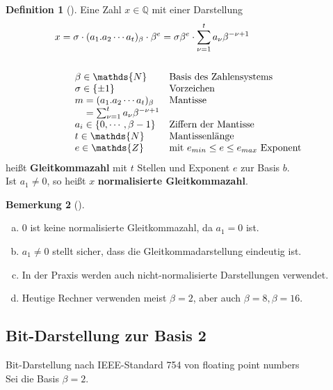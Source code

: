 \documentclass[ngerman,fontsize=11pt, paper=a4, parskip=half, titlepage=true, toc=bib]{scrbook}
\theoremstyle{definition}
\newtheorem{Def}{Definition}[section]		%
\newtheorem{Bem}[Def]{Bemerkung}	%
\theoremstyle{plain}
\newcommand{\Q}{\mathds{Q}}
\newcommand{\N}{\mathds{N}}
\newcommand{\Z}{\mathds{Z}}
\newcommand{\subsectione}[1]{\addtocounter{Def}{1}\subsection{#1}}
\newenvironment{Beme}[1][]{ %
  \begin{Bem}[#1]
  }
  {
  \end{Bem}
  \addtocounter{subsection}{1}
}
\newenvironment{Defe}[1][]{ %
  \begin{Def}[#1]
  }
  {
  \end{Def}
  \addtocounter{subsection}{1}
}
\begin{document}
\begin{Defe}
  \label{3.1.1} 
  Eine Zahl $x\in\Q$ mit einer Darstellung
  \begin{align*}
    x&=\sigma \cdot(a_1 . a_2 \cdots a_t)_{\beta}\cdot \beta^e 
       = \sigma\beta^e \cdot \sum_{\nu=1}^{t}a_\nu \beta^{-\nu+1}\\\\
     &\quad\begin{array}{ll}
             \beta\in\N & \text{Basis des Zahlensystems}\index{Basis}\\
             \sigma \in\{\pm 1\} &\text{Vorzeichen} \\
             m = (a_1 . a_2 \cdots a_t)_{\beta} &\text{Mantisse}\index{Mantisse}\\
             \phantom{m}= \sum_{\nu=1}^{t}a_\nu \beta^{-\nu+1} \\
             a_i \in\{0,\cdots , \beta-1\}&\text{Ziffern der Mantisse}\\
             t\in\N&\text{Mantissenlänge} \\
             e\in\Z &\text{mit }e_{min}\leq e \leq e_{max} \text{ Exponent}
           \end{array}
  \end{align*}
  heißt \textbf{Gleitkommazahl} mit $t$ Stellen und Exponent $e$ zur Basis $b$. \\
  Ist $a_1\neq 0$, so heißt $x$ \textbf{normalisierte Gleitkommazahl}.
\end{Defe}

\begin{Beme}
  \label{3.1.2}~
  \begin{enumerate}[a)]
  \item 0 ist keine normalisierte Gleitkommazahl, da $a_1 =  0$ ist.
  \item $a_1\neq 0$ stellt sicher, dass die Gleitkommadarstellung eindeutig ist.
  \item In der Praxis werden auch nicht-normalisierte Darstellungen verwendet.
  \item Heutige Rechner verwenden meist $\beta =2$, aber auch $\beta=8, \beta=16$.
  \end{enumerate}
\end{Beme}

\subsectione{Bit-Darstellung zur Basis 2}
\label{3.1.3}
Bit-Darstellung nach IEEE-Standard 754 von floating point numbers \\
Sei die Basis $\beta=2$.
\end{document}
